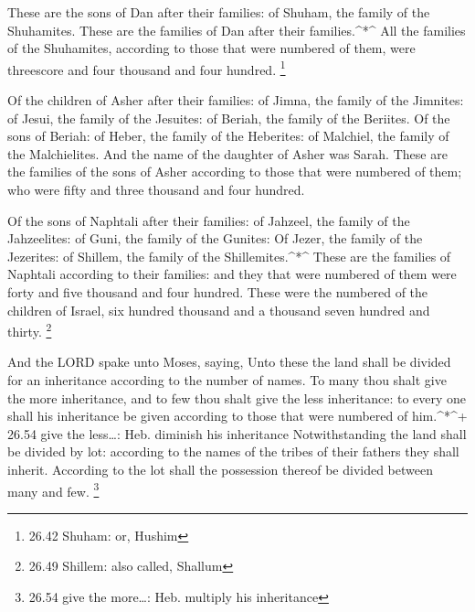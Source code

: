  These are the sons of Dan after their families: of Shuham,
the family of the Shuhamites. These are the families of Dan after their
families.\^{}*\^{}  All the families of the Shuhamites,
according to those that were numbered of them, were threescore and four
thousand and four hundred. \footnote{26.42 Shuham: or, Hushim}

 Of the children of Asher after their families: of Jimna,
the family of the Jimnites: of Jesui, the family of the Jesuites: of
Beriah, the family of the Beriites.  Of the sons of Beriah:
of Heber, the family of the Heberites: of Malchiel, the family of the
Malchielites.  And the name of the daughter of Asher was
Sarah.  These are the families of the sons of Asher
according to those that were numbered of them; who were fifty and three
thousand and four hundred.

 Of the sons of Naphtali after their families: of Jahzeel,
the family of the Jahzeelites: of Guni, the family of the Gunites:
 Of Jezer, the family of the Jezerites: of Shillem, the
family of the Shillemites.\^{}*\^{}  These are the families
of Naphtali according to their families: and they that were numbered of
them were forty and five thousand and four hundred.  These
were the numbered of the children of Israel, six hundred thousand and a
thousand seven hundred and thirty. \footnote{26.49 Shillem: also called,
  Shallum}

 And the LORD spake unto Moses, saying,  Unto
these the land shall be divided for an inheritance according to the
number of names.  To many thou shalt give the more
inheritance, and to few thou shalt give the less inheritance: to every
one shall his inheritance be given according to those that were numbered
of him.\^{}*\^{}+ 26.54 give the less\ldots: Heb. diminish his
inheritance  Notwithstanding the land shall be divided by
lot: according to the names of the tribes of their fathers they shall
inherit.  According to the lot shall the possession thereof
be divided between many and few. \footnote{26.54 give the more\ldots:
  Heb. multiply his inheritance}


